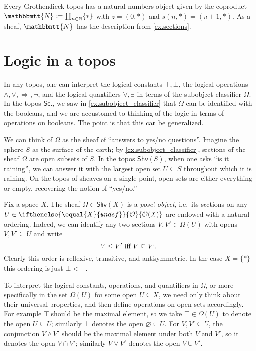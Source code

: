 \documentclass[reqno,11pt]{amsproc}
\theoremstyle{plain}
\theoremstyle{definition}
\newcommand{\cat}[1]{\mathsf{#1}}
\newcommand{\Set}{\cat{Set}}
\newcommand{\tn}[1]{\textnormal{#1}}
\newcommand{\internal}[1]{\raisebox{-.03ex}{$\mathbbmtt{#1}$}}
\newcommand{\nn}{\mathbb{N}}
\newcommand{\hs}{\hspace{1pt}}
\newcommand{\tnn}{\internal{N}\hs}
\newcommand{\shv}{\cat{Shv}}
\newcommand{\Op}[1][undef]{\ifthenelse{\equal{#1}{undef}}{\mathcal{O}}{\mathcal{O}(#1)}}
\newcommand{\imp}{\Rightarrow}
\newcommand{\true}{\top}
\newcommand{\false}{\bot}
\numberwithin{equation}{section}
\begin{document}
Every Grothendieck topos has a natural numbers object given by the coproduct $\tnn\coloneqq\coprod_{n\in\nn}\{*\}$ with $z=(0,*)$ and $s(n,*)=(n+1,*)$. As a sheaf, $\tnn$ has the description from \cref{ex.sections}.


\section{Logic in a topos}\label{sec.logic}

In any topos, one can interpret the logical constants $\true,\false$, the logical operations $\wedge,\vee,\imp,\neg$, and the logical quantifiers $\forall,\exists$ in terms of the subobject classifier $\Omega$. In the topos $\Set$, we saw in \cref{ex.subobject_classifier} that $\Omega$ can be identified with the booleans, and we are accustomed to thinking of the logic in terms of operations on booleans. The point is that this can be generalized.

We can think of $\Omega$ as the sheaf of ``answers to yes/no questions''. Imagine the sphere $S$ as the surface of the earth; by \cref{ex.subobject_classifier}, sections of the sheaf $\Omega$ are open subsets of $S$. In the topos $\shv(S)$, when one asks ``is it raining'', we can answer it with the largest open set $U\subseteq S$ throughout which it is raining. On the topos of sheaves on a single point, open sets are either everything or empty, recovering the notion of ``yes/no.''

Fix a space $X$. The sheaf $\Omega\in\shv(X)$ is a \emph{poset object}, i.e.\ its sections on any $U\in\Op[X]$ are endowed with a natural ordering. Indeed, we can identify any two sections $V,V'\in\Omega(U)$ with opens $V,V'\subseteq U$ and write
\begin{equation}\label{eqn.prop_order}
V\leq V'\tn{ iff }V\subseteq V'.
\end{equation} 
Clearly this order is reflexive, transitive, and antisymmetric. In the case $X=\{*\}$ this ordering is just $\false<\true$.

To interpret the logical constants, operations, and quantifiers in $\Omega$, or more specifically in the set $\Omega(U)$ for some open $U\subseteq X$, we need only think about their universal properties, and then define operations on open sets accordingly. For example $\true$ should be the maximal element, so we take $\true\in\Omega(U)$ to denote the open $U\subseteq U$; similarly $\false$ denotes the open $\varnothing\subseteq U$. For $V,V'\subseteq U$, the conjunction $V\wedge V'$ should be the maximal element under both $V$ and $V'$, so it denotes the open $V\cap V'$; similarly $V\vee V'$ denotes the open $V\cup V'$.
\end{document}
